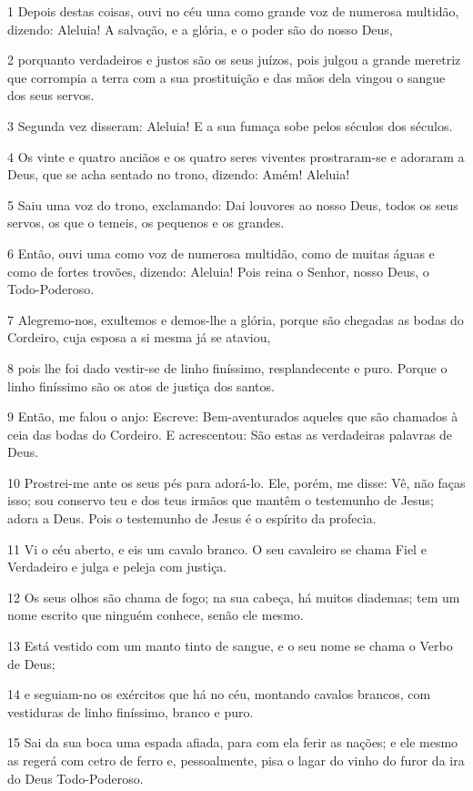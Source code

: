 \par 1 Depois destas coisas, ouvi no céu uma como grande voz de numerosa multidão, dizendo: Aleluia! A salvação, e a glória, e o poder são do nosso Deus,
\par 2 porquanto verdadeiros e justos são os seus juízos, pois julgou a grande meretriz que corrompia a terra com a sua prostituição e das mãos dela vingou o sangue dos seus servos.
\par 3 Segunda vez disseram: Aleluia! E a sua fumaça sobe pelos séculos dos séculos.
\par 4 Os vinte e quatro anciãos e os quatro seres viventes prostraram-se e adoraram a Deus, que se acha sentado no trono, dizendo: Amém! Aleluia!
\par 5 Saiu uma voz do trono, exclamando: Dai louvores ao nosso Deus, todos os seus servos, os que o temeis, os pequenos e os grandes.
\par 6 Então, ouvi uma como voz de numerosa multidão, como de muitas águas e como de fortes trovões, dizendo: Aleluia! Pois reina o Senhor, nosso Deus, o Todo-Poderoso.
\par 7 Alegremo-nos, exultemos e demos-lhe a glória, porque são chegadas as bodas do Cordeiro, cuja esposa a si mesma já se ataviou,
\par 8 pois lhe foi dado vestir-se de linho finíssimo, resplandecente e puro. Porque o linho finíssimo são os atos de justiça dos santos.
\par 9 Então, me falou o anjo: Escreve: Bem-aventurados aqueles que são chamados à ceia das bodas do Cordeiro. E acrescentou: São estas as verdadeiras palavras de Deus.
\par 10 Prostrei-me ante os seus pés para adorá-lo. Ele, porém, me disse: Vê, não faças isso; sou conservo teu e dos teus irmãos que mantêm o testemunho de Jesus; adora a Deus. Pois o testemunho de Jesus é o espírito da profecia.
\par 11 Vi o céu aberto, e eis um cavalo branco. O seu cavaleiro se chama Fiel e Verdadeiro e julga e peleja com justiça.
\par 12 Os seus olhos são chama de fogo; na sua cabeça, há muitos diademas; tem um nome escrito que ninguém conhece, senão ele mesmo.
\par 13 Está vestido com um manto tinto de sangue, e o seu nome se chama o Verbo de Deus;
\par 14 e seguiam-no os exércitos que há no céu, montando cavalos brancos, com vestiduras de linho finíssimo, branco e puro.
\par 15 Sai da sua boca uma espada afiada, para com ela ferir as nações; e ele mesmo as regerá com cetro de ferro e, pessoalmente, pisa o lagar do vinho do furor da ira do Deus Todo-Poderoso.
